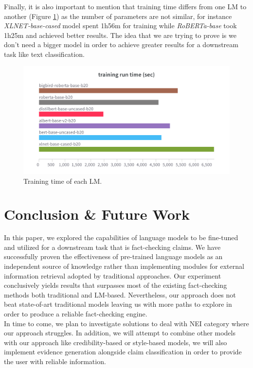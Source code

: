 \documentclass[10pt, english]{report}
\begin{document}
Finally, it is also important to mention that training time differs from one LM to another (Figure \ref{fig:train_time}) as the number of parameters are not similar, for instance \textit{XLNET-base-cased} model spent 1h56m for training while \textit{RoBERTa-base} took 1h25m and achieved better results. The idea that we are trying to prove is we don't need a bigger model in order to achieve greater results for a downstream task like text classification.

\begin{figure}[htp]
    \centering
    \includegraphics[scale=0.2]{img/train_time.png}
    \caption[Comparison]{Training time of each LM.}
    \label{fig:train_time}
\end{figure}

\chapter{Conclusion \& Future Work}

In this paper, we explored the capabilities of language models to be fine-tuned and utilized for a downstream task that is fact-checking claims. We have successfully proven the effectiveness of pre-trained language models as an independent source of knowledge rather than implementing modules for external information retrieval adopted by traditional approaches. Our experiment conclusively yields results that surpasses most of the existing fact-checking methods both traditional and LM-based. Nevertheless, our approach does not beat state-of-art traditional models leaving us with more paths to explore in order to produce a reliable fact-checking engine.\\

In time to come, we plan to investigate solutions to deal with NEI category where our approach struggles. In addition, we will attempt to combine other models with our approach like credibility-based or style-based models, we will also implement evidence generation alongside claim classification in order to provide the user with reliable information.\\
\end{document}
